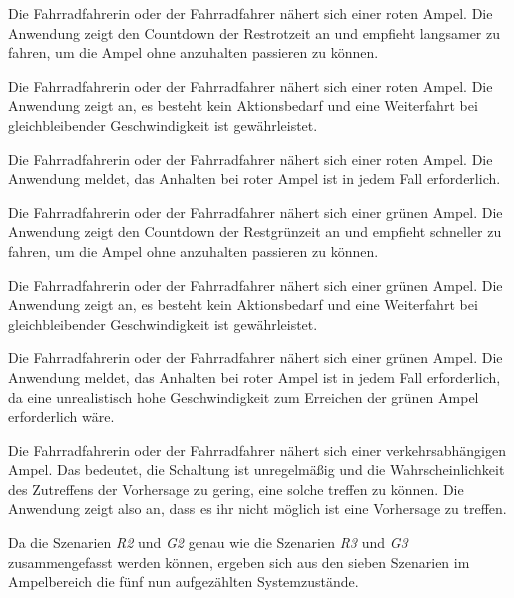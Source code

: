 \begin{description}[leftmargin=0.7cm,style=nextline]
\item[Szenario R1:] 
Die Fahrradfahrerin oder der Fahrradfahrer nähert sich einer roten Ampel. Die Anwendung zeigt den Countdown der Restrotzeit an und empfieht langsamer zu fahren, um die Ampel ohne anzuhalten passieren zu können.  \\
\item[Szenario R2:] 
Die Fahrradfahrerin oder der Fahrradfahrer nähert sich einer roten Ampel. Die Anwendung zeigt an, es besteht kein Aktionsbedarf und eine Weiterfahrt bei gleichbleibender Geschwindigkeit ist gewährleistet. \\
\item[Szenario R3:] 
Die Fahrradfahrerin oder der Fahrradfahrer nähert sich einer roten Ampel. Die Anwendung meldet, das Anhalten bei roter Ampel ist in jedem Fall erforderlich.\\
\item[Szenario G1:] 
Die Fahrradfahrerin oder der Fahrradfahrer nähert sich einer grünen Ampel. Die Anwendung zeigt den Countdown der Restgrünzeit an und empfieht schneller zu fahren, um die Ampel ohne anzuhalten passieren zu können.\\
\item[Szenario G2:] 
Die Fahrradfahrerin oder der Fahrradfahrer nähert sich einer grünen Ampel. Die Anwendung zeigt an, es besteht kein Aktionsbedarf und eine Weiterfahrt bei gleichbleibender Geschwindigkeit ist gewährleistet.\\ 
\item[Szenario G3:] 
Die Fahrradfahrerin oder der Fahrradfahrer nähert sich einer grünen Ampel. Die Anwendung meldet, das Anhalten bei roter Ampel ist in jedem Fall erforderlich, da eine unrealistisch hohe Geschwindigkeit zum Erreichen der grünen Ampel erforderlich wäre.\\
\item[Szenario V1:] 
Die Fahrradfahrerin oder der Fahrradfahrer nähert sich einer verkehrsabhängigen Ampel. Das bedeutet, die Schaltung ist unregelmäßig und die Wahrscheinlichkeit des Zutreffens der Vorhersage zu gering, eine solche treffen zu können. Die Anwendung zeigt also an, dass es ihr nicht möglich ist eine Vorhersage zu treffen.\\ 
\end{description} \vspace{27pt}
Da die Szenarien \textit{R2} und \textit{G2} genau wie die Szenarien \textit{R3} und \textit{G3} zusammengefasst werden können, ergeben sich aus den sieben Szenarien im Ampelbereich die fünf nun aufgezählten Systemzustände.
